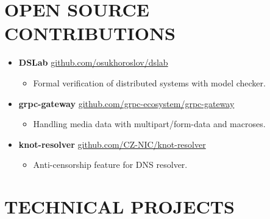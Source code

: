 \documentclass[paper=a4,fontsize=11pt]{scrartcl} %
\newcommand*\Hs{\ensuremath{\color{red}\varheartsuit}}
\newcommand{\heartstab}{%
}
\newcommand{\NewPart}[1]{\section*{\uppercase{#1}}}
\begin{document}
\NewPart{Open Source Contributions}{}

\begin{itemize}
    \item[\heartstab] \textbf{DSLab} \href{https://github.com/osukhoroslov/dslab}{github.com/osukhoroslov/dslab}
    \begin{itemize}
        \item Formal verification of distributed systems with model checker.
    \end{itemize}
    
    \item[\heartstab] \textbf{grpc-gateway} \href{https://github.com/grpc-ecosystem/grpc-gateway}{github.com/grpc-ecosystem/grpc-gateway}
    \begin{itemize}
        \item Handling media data with multipart/form-data and macroses.
    \end{itemize}
    
    \item[\heartstab] \textbf{knot-resolver} \href{https://github.com/CZ-NIC/knot-resolver}{github.com/CZ-NIC/knot-resolver}
    \begin{itemize}
        \item Anti-censorship feature for DNS resolver.
    \end{itemize}
\end{itemize}

\NewPart{Technical Projects}{}
\end{document}
